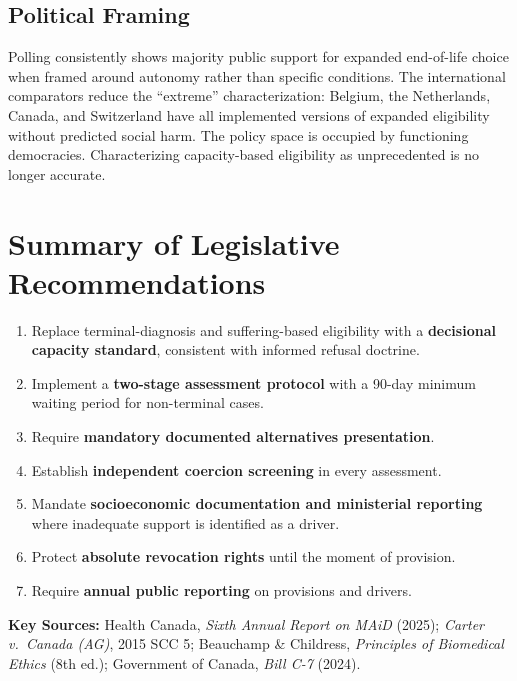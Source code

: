 \documentclass[11pt, letterpaper]{article}
\begin{document}
\subsection{Political Framing}

Polling consistently shows majority public support for expanded end-of-life choice when
framed around autonomy rather than specific conditions. The international comparators reduce
the ``extreme'' characterization: Belgium, the Netherlands, Canada, and Switzerland have all
implemented versions of expanded eligibility without predicted social harm. The policy space
is occupied by functioning democracies. Characterizing capacity-based eligibility as
unprecedented is no longer accurate.

\section*{Summary of Legislative Recommendations}

\begin{enumerate}
  \item Replace terminal-diagnosis and suffering-based eligibility with a
    \textbf{decisional capacity standard}, consistent with informed refusal doctrine.
  \item Implement a \textbf{two-stage assessment protocol} with a 90-day minimum
    waiting period for non-terminal cases.
  \item Require \textbf{mandatory documented alternatives presentation}.
  \item Establish \textbf{independent coercion screening} in every assessment.
  \item Mandate \textbf{socioeconomic documentation and ministerial reporting}
    where inadequate support is identified as a driver.
  \item Protect \textbf{absolute revocation rights} until the moment of provision.
  \item Require \textbf{annual public reporting} on provisions and drivers.
\end{enumerate}

\bigskip

{\small\sffamily\color{C@midgray}
\textbf{Key Sources:} Health Canada, \textit{Sixth Annual Report on MAiD} (2025);
\textit{Carter v.\ Canada (AG)}, 2015 SCC 5; Beauchamp \& Childress,
\textit{Principles of Biomedical Ethics} (8th ed.); Government of Canada,
\textit{Bill C-7} (2024).}
\end{document}
